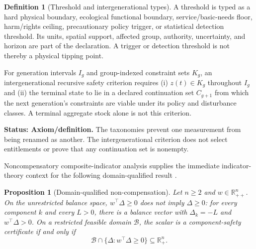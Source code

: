 \documentclass[11pt]{article}
\newtheorem{proposition}{Proposition}
\theoremstyle{definition}
\newtheorem{definition}{Definition}
\newcommand{\R}{\mathbb R}
\newcommand{\Rp}{\mathbb R_+}
\newcommand{\status}[1]{\par\smallskip\noindent\textbf{Status: #1.}\quad}
\begin{document}
\begin{definition}[Threshold and intergenerational types]
A threshold is typed as a hard physical boundary, ecological functional boundary, service/basic-needs floor, harm/rights ceiling, precautionary policy trigger, or statistical detection threshold. Its units, spatial support, affected group, authority, uncertainty, and horizon are part of the declaration. A trigger or detection threshold is not thereby a physical tipping point.

For generation intervals $I_g$ and group-indexed constraint sets $K_g$, an intergenerational recursive safety criterion requires (i) $z(t)\in K_g$ throughout $I_g$ and (ii) the terminal state to lie in a declared continuation set $C_{g+1}$ from which the next generation's constraints are viable under its policy and disturbance classes. A terminal aggregate stock alone is not this criterion.
\end{definition}

\status{Axiom/definition} The taxonomies prevent one measurement from being renamed as another. The intergenerational criterion does not select entitlements or prove that any continuation set is nonempty.

Noncompensatory composite-indicator analysis supplies the immediate indicator-theory context for the following domain-qualified result \cite{munda2009}.

\begin{proposition}[Domain-qualified non-compensation]
\label{prop:noncompensation}
Let $n\ge2$ and $w\in\R_{++}^n$. On the unrestricted balance space, $w^\top \Delta\ge0$ does not imply $\Delta\ge0$: for every component $k$ and every $L>0$, there is a balance vector with $\Delta_k=-L$ and $w^\top \Delta>0$. On a restricted feasible domain $\mathcal B$, the scalar is a component-safety certificate if and only if
\begin{equation}
\mathcal B\cap\{\Delta:w^\top \Delta\ge0\}\subseteq\Rp^n.
\label{eq:domain-certificate}
\end{equation}
\end{proposition}
\end{document}
